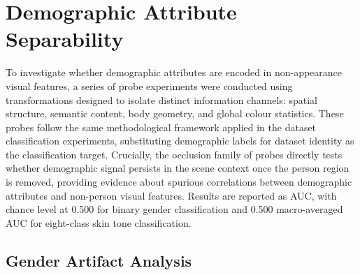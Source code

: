 \section{Demographic Attribute Separability}

To investigate whether demographic attributes are encoded in non-appearance visual
features, a series of probe experiments were conducted using transformations designed to
isolate distinct information channels: spatial structure, semantic content, body geometry,
and global colour statistics. These probes follow the same methodological framework
applied in the dataset classification experiments, substituting demographic labels for
dataset identity as the classification target. Crucially, the occlusion family of probes
directly tests whether demographic signal persists in the scene context once the person
region is removed, providing evidence about spurious correlations between demographic
attributes and non-person visual features. Results are reported as AUC, with chance level
at 0.500 for binary gender classification and 0.500 macro-averaged AUC for eight-class
skin tone classification.

\subsection{Gender Artifact Analysis}

